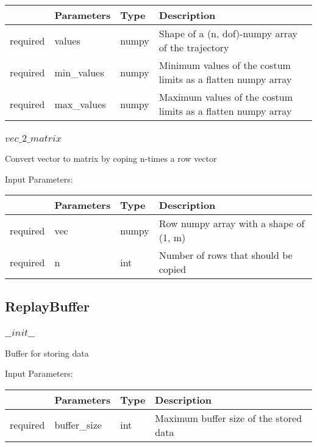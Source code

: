 \documentclass[
	ngerman,
	accentcolor=9c,%
	type=intern,
	marginpar=false
	]{tudapub}
\begin{document}
\begin{tabular}{|p{}|p{}|p{}| p{}|}
\hline
 & \textbf{Parameters} & \textbf{Type} & \textbf{Description} \\
\hline
required & values & numpy & Shape of a (n, dof)-numpy array of the trajectory \\
\hline
required & min\_values & numpy & Minimum values of the costum limits as a flatten numpy array \\
\hline
required & max\_values & numpy & Maximum values of the costum limits as a flatten numpy array\\
\hline
\end{tabular}
\vspace{1cm}

\subsubsection{$vec\_2\_matrix$}
\noindent Convert vector to matrix by coping n-times a row vector


\vspace{0.5cm}
\noindent Input Parameters:
\vspace{0.5cm}

\begin{tabular}{|p{}|p{}|p{}| p{}|}
\hline
 & \textbf{Parameters} & \textbf{Type} & \textbf{Description} \\
\hline
required & vec & numpy & Row numpy array with a shape of (1, m) \\
\hline
required & n & int & Number of rows that should be copied \\
\hline
\end{tabular}
\vspace{1cm}



\subsection{ReplayBuffer}
\subsubsection{$\_\_init\_\_$}
\noindent Buffer for storing data


\vspace{0.5cm}
\noindent Input Parameters:
\vspace{0.5cm}

\begin{tabular}{|p{}|p{}|p{}| p{}|}
\hline
 & \textbf{Parameters} & \textbf{Type} & \textbf{Description} \\
\hline
required & buffer\_size & int & Maximum buffer size of the stored data \\
\hline
\end{tabular}
\end{document}
